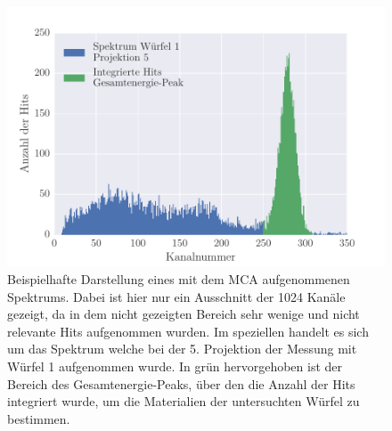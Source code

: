 \begin{figure}[!h]
 \centering
 \includegraphics[scale=0.90]{../Grafiken/Spektrum_Block_1_Messung_5_0_350_histogram_intervall.pdf}
 \caption{Beispielhafte Darstellung eines mit dem MCA aufgenommenen 
 	Spektrums. Dabei ist hier nur ein Ausschnitt der 1024 Kanäle gezeigt, da in dem nicht gezeigten Bereich  
 	sehr wenige und nicht relevante Hits aufgenommen wurden. Im speziellen handelt es sich um das Spektrum welche bei der 5. 
 	Projektion der Messung mit Würfel 1 aufgenommen wurde. In grün hervorgehoben ist der Bereich des 
 	Gesamtenergie-Peaks, über den die Anzahl der Hits integriert wurde, um die Materialien der untersuchten 
 	Würfel zu bestimmen.  
 	\label{fig:spektrum_block_1_messung_5_0_350_histogram_intervall}}
 \end{figure} 